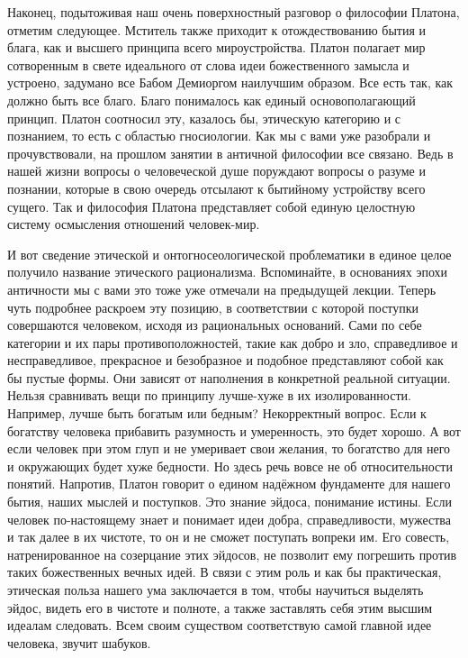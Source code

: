 Наконец, подытоживая наш очень поверхностный разговор о философии
Платона, отметим следующее. Мститель также приходит к отождествованию бытия и
блага, как и высшего принципа всего мироустройства. Платон полагает мир
сотворенным в свете идеального от слова идеи божественного замысла и устроено,
задумано все Бабом Демиоргом наилучшим образом. Все есть так, как должно быть
все благо. Благо понималось как единый основополагающий принцип. Платон
соотносил эту, казалось бы, этическую категорию и с познанием, то есть с
областью гносиологии. Как мы с вами уже разобрали и прочувствовали, на прошлом
занятии в античной философии все связано. Ведь в нашей жизни вопросы о
человеческой душе поруждают вопросы о разуме и познании, которые в свою очередь
отсылают к бытийному устройству всего сущего. Так и философия Платона
представляет собой единую целостную систему осмысления отношений человек-мир. 

И
вот сведение этической и онтогносеологической проблематики в единое целое
получило название этического рационализма. Вспоминайте, в основаниях эпохи
античности мы с вами это тоже уже отмечали на предыдущей лекции. Теперь чуть
подробнее раскроем эту позицию, в соответствии с которой поступки совершаются
человеком, исходя из рациональных оснований. Сами по себе категории и их пары
противоположностей, такие как добро и зло, справедливое и несправедливое,
прекрасное и безобразное и подобное представляют собой как бы пустые формы. Они
зависят от наполнения в конкретной реальной ситуации. Нельзя сравнивать вещи по
принципу лучше-хуже в их изолированности. Например, лучше быть богатым или
бедным? Некорректный вопрос. Если к богатству человека прибавить разумность и
умеренность, это будет хорошо. А вот если человек при этом глуп и не умеривает
свои желания, то богатство для него и окружающих будет хуже бедности. Но здесь
речь вовсе не об относительности понятий. Напротив, Платон говорит о едином
надёжном фундаменте для нашего бытия, наших мыслей и поступков. Это знание
эйдоса, понимание истины. Если человек по-настоящему знает и понимает идеи
добра, справедливости, мужества и так далее в их чистоте, то он и не сможет
поступать вопреки им. Его совесть, натренированное на созерцание этих эйдосов,
не позволит ему погрешить против таких божественных вечных идей. В связи с этим
роль и как бы практическая, этическая польза нашего ума заключается в том, чтобы
научиться выделять эйдос, видеть его в чистоте и полноте, а также заставлять
себя этим высшим идеалам следовать. Всем своим существом соответствую самой
главной идее человека, звучит шабуков. 


